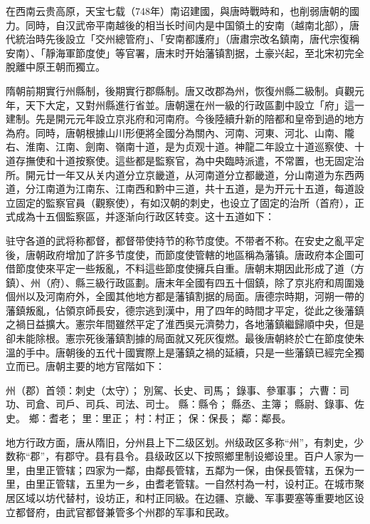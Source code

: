 在西南云贵高原，天宝七载（748年）南诏建國，與唐時戰時和，也削弱唐朝的國力。同時，自汉武帝平南越後的相当长时间内是中国領土的安南（越南北部），唐代統治時先後設立「交州總管府」、「安南都護府」（唐肅宗改名鎮南，唐代宗復稱安南）、「靜海軍節度使」等官署，唐末时开始藩镇割据，土豪兴起，至北宋初完全脫離中原王朝而獨立。

隋朝前期實行州縣制，後期實行郡縣制。唐又改郡為州，恢復州縣二級制。貞觀元年，天下大定，又對州縣進行省並。唐朝還在州一級的行政區劃中設立「府」這一建制。先是開元元年設立京兆府和河南府。今後陸續升新的陪都和皇帝到過的地方為府。同時，唐朝根據山川形便將全國分為關內、河南、河東、河北、山南、隴右、淮南、江南、劍南、嶺南十道，是为贞观十道。神龍二年設立十道巡察使、十道存撫使和十道按察使。這些都是監察官，為中央臨時派遣，不常置，也无固定治所。開元廿一年又从关内道分立京畿道，从河南道分立都畿道，分山南道为东西两道，分江南道为江南东、江南西和黔中三道，共十五道，是为开元十五道，每道設立固定的監察官員（觀察使），有如汉朝的刺史，也设立了固定的治所（首府），正式成為十五個監察區，并逐渐向行政区转变。这十五道如下：

驻守各道的武将称都督，都督带使持节的称节度使。不带者不称。在安史之亂平定後，唐朝政府增加了許多节度使，而節度使管轄的地區稱為藩镇。唐政府本企圖可借節度使來平定一些叛亂，不料這些節度使擁兵自重。唐朝末期因此形成了道（方鎮）、州（府）、縣三級行政區劃。唐末年全國有四五十個鎮，除了京兆府和周圍幾個州以及河南府外，全國其他地方都是藩镇割据的局面。唐德宗時期，河朔一帶的藩鎮叛亂，佔領京師長安，德宗逃到漢中，用了四年的時間才平定，從此之後藩鎮之禍日益擴大。憲宗年間雖然平定了淮西吳元濟勢力，各地藩鎮繼歸順中央，但是卻未能除根。憲宗死後藩鎮割據的局面就又死灰復燃。最後唐朝終於亡在節度使朱溫的手中。唐朝後的五代十國實際上是藩鎮之禍的延續，只是一些藩鎮已經完全獨立而已。唐朝主要的地方官階如下：

州（郡）首领：刺史（太守）；
別駕、长史、司馬；
錄事、參軍事；
六曹：司功、司倉、司戶、司兵、司法、司士。
縣：縣令；
縣丞、主簿；
縣尉、錄事、佐史。
鄉：耆老；
里：里正；
村：村正；
保：保長；
鄰：鄰長。

地方行政方面，唐从隋旧，分州县上下二级区划。州级政区多称“州”，有刺史，少数称“郡”，有郡守。县有县令。县级政区以下按照鄉里制设鄉设里。百户人家为一里，由里正管辖；四家为一鄰，由鄰長管辖，五鄰为一保，由保長管辖，五保为一里，由里正管辖，五里为一乡，由耆老管辖。一自然村為一村，设村正。在城市聚居区域以坊代替村，设坊正，和村正同級。在边疆、京畿、军事要塞等重要地区设立都督府，由武官都督兼管多个州郡的军事和民政。

